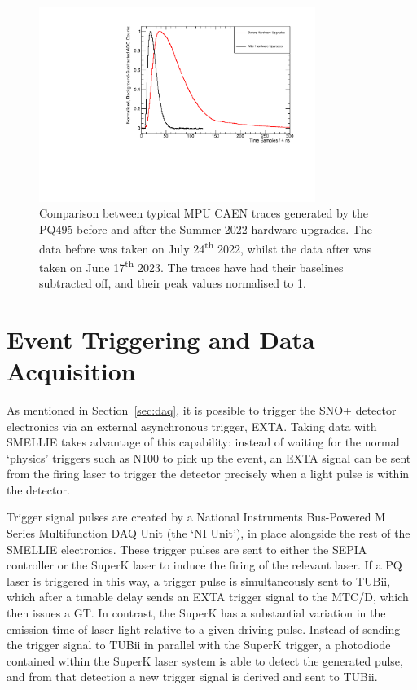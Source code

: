 \begin{figure}
    \centering
    \includegraphics[width=0.8\textwidth]{3_SMELLIEHardware/images/caen_traces_comparison_plot.pdf}
    \caption[Comparison between typical MPU CAEN traces generated by the PQ495 before and after the Summer 2022 hardware upgrades]
    {Comparison between typical MPU CAEN traces generated by the PQ495 before and after the Summer 2022 hardware upgrades. The data before was taken on July 24\textsuperscript{th} 2022, whilst the data after was taken on June 17\textsuperscript{th} 2023. The traces have had their baselines subtracted off, and their peak values normalised to 1.}
    \label{fig:caen_trace_comparison}
\end{figure}

\section{Event Triggering and Data Acquisition}\label{sec:smellie_triggering_daq}
As mentioned in Section~\ref{sec:daq}, it is possible to trigger the SNO+ detector electronics via an external asynchronous trigger, EXTA. Taking data with SMELLIE takes advantage of this capability: instead of waiting for the normal `physics' triggers such as N100 to pick up the event, an EXTA signal can be sent from the firing laser to trigger the detector precisely when a light pulse is within the detector.

Trigger signal pulses are created by a National Instruments Bus-Powered M Series Multifunction DAQ Unit (the `NI Unit'), in place alongside the rest of the SMELLIE electronics. These trigger pulses are sent to either the SEPIA controller or the SuperK laser to induce the firing of the relevant laser. If a PQ laser is triggered in this way, a trigger pulse is simultaneously sent to TUBii, which after a tunable delay sends an EXTA trigger signal to the MTC/D, which then issues a GT. In contrast, the SuperK has a substantial variation in the emission time of laser light relative to a given driving pulse. Instead of sending the trigger signal to TUBii in parallel with the SuperK trigger, a photodiode contained within the SuperK laser system is able to detect the generated pulse, and from that detection a new trigger signal is derived and sent to TUBii.

